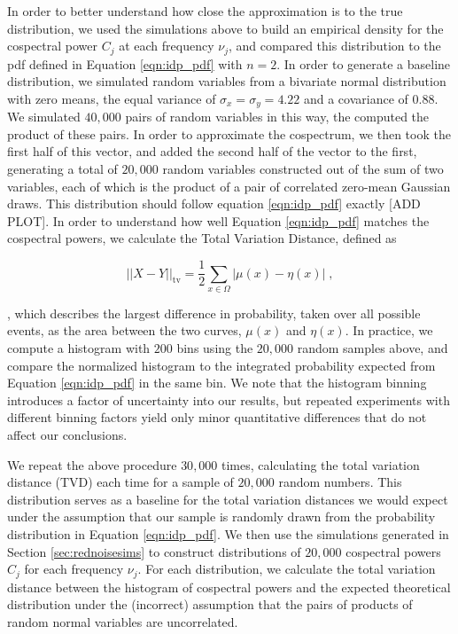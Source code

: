 \documentclass[fleqn,usenatbib]{mnras}
\begin{document}
In order to better understand how close the approximation is to the true distribution, we used the simulations above to build an empirical density for the cospectral power $C_j$ at each frequency $\nu_j$, and compared this distribution to the pdf defined in Equation \ref{eqn:idp_pdf} with $n=2$. In order to generate a baseline distribution, we simulated random variables from a bivariate normal distribution with zero means, the equal variance of $\sigma_x = \sigma_y = 4.22$ and a covariance of $0.88$. We simulated $40,000$ pairs of random variables in this way, the computed the product of these pairs. In order to approximate the cospectrum, we then took the first half of this vector, and added the second half of the vector to the first, generating a total of $20,000$ random variables constructed out of the sum of two variables, each of which is the product of a pair of correlated zero-mean Gaussian draws. This distribution should follow equation \ref{eqn:idp_pdf} exactly [ADD PLOT]. In order to understand how well Equation \ref{eqn:idp_pdf} matches the cospectral powers, we calculate the Total Variation Distance, defined as 

\begin{equation}
\label{eqn:tvs}
||X - Y||_\mathrm{tv} = \frac{1}{2} \sum_{x \in \Omega}|\mu(x) - \eta(x)| \; ,
\end{equation}

\noindent, which describes the largest difference in probability, taken over all possible events, as the area between the two curves, $\mu(x)$ and $\eta(x)$. In practice, we compute a histogram with $200$ bins using the $20,000$ random samples above, and compare the normalized histogram to the integrated probability expected from Equation \ref{eqn:idp_pdf} in the same bin. We note that the histogram binning introduces a factor of uncertainty into our results, but repeated experiments with different binning factors yield only minor quantitative differences that do not affect our conclusions.

We repeat the above procedure $30,000$ times, calculating the total variation distance (TVD) each time for a sample of $20,000$ random numbers. This distribution serves as a baseline for the total variation distances we would expect under the assumption that our sample is randomly drawn from the probability distribution in Equation \ref{eqn:idp_pdf}. We then use the simulations generated in Section \ref{sec:rednoisesims} to construct distributions of $20,000$ cospectral powers $C_j$ for each frequency $\nu_j$. For each distribution, we calculate the total variation distance between the histogram of cospectral powers and the expected theoretical distribution under the (incorrect) assumption that the pairs of products of random normal variables are uncorrelated. 
\end{document}
